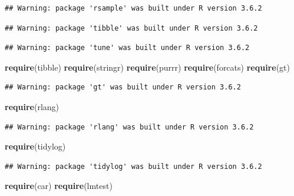 \documentclass[]{article}
\newenvironment{Shaded}{\begin{snugshade}}{\end{snugshade}}
\newcommand{\KeywordTok}[1]{\textcolor[rgb]{0.13,0.29,0.53}{\textbf{#1}}}
\newcommand{\NormalTok}[1]{#1}
\begin{document}
\begin{verbatim}
## Warning: package 'rsample' was built under R version 3.6.2
\end{verbatim}

\begin{verbatim}
## Warning: package 'tibble' was built under R version 3.6.2
\end{verbatim}

\begin{verbatim}
## Warning: package 'tune' was built under R version 3.6.2
\end{verbatim}

\begin{Shaded}
\begin{Highlighting}[]
\KeywordTok{require}\NormalTok{(tibble)}
\KeywordTok{require}\NormalTok{(stringr)}
\KeywordTok{require}\NormalTok{(purrr)}
\KeywordTok{require}\NormalTok{(forcats)}
\KeywordTok{require}\NormalTok{(gt)}
\end{Highlighting}
\end{Shaded}

\begin{verbatim}
## Warning: package 'gt' was built under R version 3.6.2
\end{verbatim}

\begin{Shaded}
\begin{Highlighting}[]
\KeywordTok{require}\NormalTok{(rlang)}
\end{Highlighting}
\end{Shaded}

\begin{verbatim}
## Warning: package 'rlang' was built under R version 3.6.2
\end{verbatim}

\begin{Shaded}
\begin{Highlighting}[]
\KeywordTok{require}\NormalTok{(tidylog)}
\end{Highlighting}
\end{Shaded}

\begin{verbatim}
## Warning: package 'tidylog' was built under R version 3.6.2
\end{verbatim}

\begin{Shaded}
\begin{Highlighting}[]
\KeywordTok{require}\NormalTok{(car)}
\KeywordTok{require}\NormalTok{(lmtest)}
\end{Highlighting}
\end{Shaded}
\end{document}
